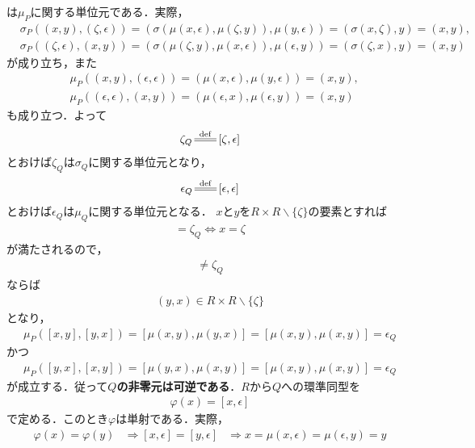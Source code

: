 	は$\mu_P$に関する単位元である．実際，
	\begin{align}
		&\sigma_P((x,y),(\zeta,\epsilon))
		= (\sigma(\mu(x,\epsilon),\mu(\zeta,y)),\mu(y,\epsilon))
		= (\sigma(x,\zeta),y)
		= (x,y), \\
		&\sigma_P((\zeta,\epsilon),(x,y))
		= (\sigma(\mu(\zeta,y),\mu(x,\epsilon)),\mu(\epsilon,y))
		= (\sigma(\zeta,x),y)
		= (x,y)
	\end{align}
	が成り立ち，また
	\begin{align}
		&\mu_P((x,y),(\epsilon,\epsilon)) = (\mu(x,\epsilon),\mu(y,\epsilon)) = (x,y), \\
		&\mu_P((\epsilon,\epsilon),(x,y)) = (\mu(\epsilon,x),\mu(\epsilon,y)) = (x,y)
	\end{align}
	も成り立つ．よって
	\begin{align}
		\zeta_Q \defeq [\zeta,\epsilon]
	\end{align}
	とおけば$\zeta_Q$は$\sigma_Q$に関する単位元となり，
	\begin{align}
		\epsilon_Q \defeq [\epsilon,\epsilon]
	\end{align}
	とおけば$\epsilon_Q$は$\mu_Q$に関する単位元となる．
	$x$と$y$を$R \times R \backslash \{\zeta\}$の要素とすれば
	\begin{align}
		[x,y] = \zeta_Q \Longleftrightarrow x = \zeta
	\end{align}
	が満たされるので，
	\begin{align}
		[x,y] \neq \zeta_Q
	\end{align}
	ならば
	\begin{align}
		(y,x) \in R \times R \backslash \{\zeta\}
	\end{align}
	となり，
	\begin{align}
		\mu_P([x,y],[y,x]) = [\mu(x,y),\mu(y,x)] = [\mu(x,y),\mu(x,y)] = \epsilon_Q
	\end{align}
	かつ
	\begin{align}
		\mu_P([y,x],[x,y]) = [\mu(y,x),\mu(x,y)] = [\mu(x,y),\mu(x,y)] = \epsilon_Q
	\end{align}
	が成立する．従って{\bf $Q$の非零元は可逆である}．$R$から$Q$への環準同型を
	\begin{align}
		\varphi(x) = [x,\epsilon]
	\end{align}
	で定める．このとき$\varphi$は単射である．実際，
	\begin{align}
		\varphi(x) = \varphi(y) &\Longrightarrow [x,\epsilon] = [y,\epsilon]
		&\Longrightarrow x = \mu(x,\epsilon) = \mu(\epsilon,y) = y
	\end{align}
